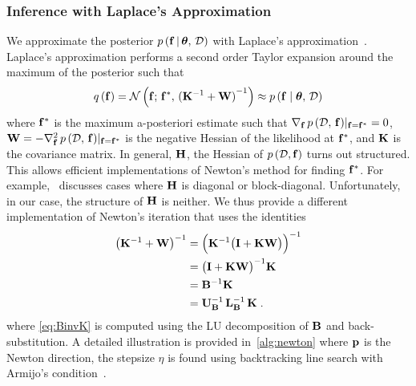 \subsubsection{Inference with Laplace's Approximation}
We approximate the posterior \(p\,(\mathbf{f}\,|\,\bm{\theta},\, \mathcal{D})\) with Laplace's approximation~\cite{williams_bayesian_1998}.
Laplace's approximation performs a second order Taylor expansion around the maximum of the posterior such that
\begin{align}
q\,(\mathbf{f}) = \mathcal{N}\left(\mathbf{f};\, \mathbf{f}^*,\, {(\mathbf{K}^{-1} + \mathbf{W})}^{-1}\right) \approx p\,(\mathbf{f} \mid \bm{\theta},\, \mathcal{D})
\end{align}
where \(\mathbf{f}^*\) is the maximum a-posteriori estimate such that \(\nabla_{\mathbf{f}}\, p\,(\mathcal{D},\, \mathbf{f})|_{\mathbf{f} = \mathbf{f}^*} = 0\), \(\mathbf{W} = -\nabla^2_{\mathbf{f}}\, p\,(\mathcal{D},\,\mathbf{f})|_{\mathbf{f}=\mathbf{f}^*} \) is the negative Hessian of the likelihood at \(\mathbf{f}^*\), and \(\mathbf{K}\) is the covariance matrix.
In general, \(\mathbf{H}\), the Hessian of \(p\,(\mathcal{D},\mathbf{f})\) turns out structured.
This allows efficient implementations of Newton's method for finding \(\mathbf{f}^*\).
For example,~\cite{rasmussen_gaussian_2006} discusses cases where \(\mathbf{H}\) is diagonal or block-diagonal.
Unfortunately, in our case, the structure of \(\mathbf{H}\) is neither.
We thus provide a different implementation of Newton's iteration that uses the identities
\begin{align}
  {\big(\mathbf{K}^{-1} + \mathbf{W}\big)}^{-1}
  &= {\Big(\mathbf{K}^{-1} \big(\mathbf{I} + \mathbf{K} \mathbf{W} \big)\Big)}^{-1} \\
  &= {{\big(\mathbf{I} + \mathbf{K} \mathbf{W} \big)}^{-1} \mathbf{K}} \\
  &= \mathbf{B}^{-1} \mathbf{K} \\
  &= \mathbf{U}_{\mathbf{B}}^{-1} \, \mathbf{L}_{\mathbf{B}}^{-1} \, \mathbf{K} \label{eq:BinvK}
\;.
\end{align}
where \cref{eq:BinvK} is computed using the LU decomposition of \(\mathbf{B}\) and back-substitution.
A detailed illustration is provided in~\cref{alg:newton} where \(\mathbf{p}\) is the Newton direction, the stepsize \(\eta\) is found using backtracking line search with Armijo's condition~\cite{nocedal_numerical_2006}.

